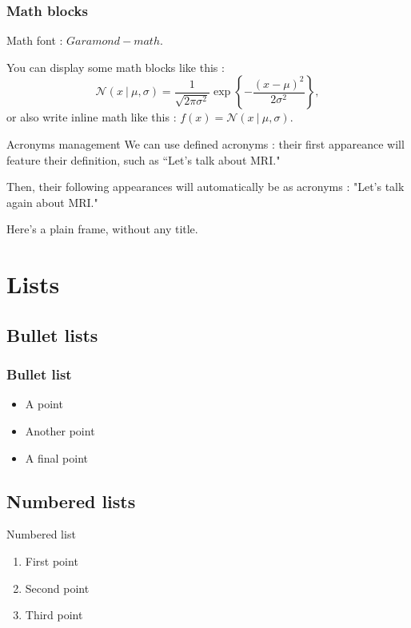 \documentclass[
  11pt, %
  aspectratio=169, %
]{beamer}
\begin{document}
\begin{frame}
  \frametitle{Math blocks}

  Math font : $Garamond-math$.

  \vfill
  You can display some math blocks like this :
  \[\mathcal{N}(x~|~\mu, \sigma) = \frac{1}{\sqrt{2\pi\sigma^2}}\exp\left\{-\frac{(x-\mu)^2}{2\sigma^2}\right\},\]
  or also write inline math like this : $f(x) = \mathcal{N}(x~|~\mu, \sigma)$.

\end{frame}

\begin{frame}{Acronyms management}
  We can use defined acronyms : their first appareance will feature their definition, such as “Let's talk about \ac{MRI}."
  \vfill

  Then, their following appearances will automatically be as acronyms : "Let's talk again about \ac{MRI}."
\end{frame}

\begin{frame}

  Here’s a plain frame, without any title.

\end{frame}

\section{Lists}

\subsection{Bullet lists}
\begin{frame}
  \frametitle{Bullet list}

  \begin{itemize}
    \item A point
    \item Another point
    \item A final point
  \end{itemize}

\end{frame}

\subsection{Numbered lists}
\begin{frame}{Numbered list}
  \begin{enumerate}
    \item First point
    \item Second point
    \item Third point
  \end{enumerate}

\end{frame}
\end{document}
